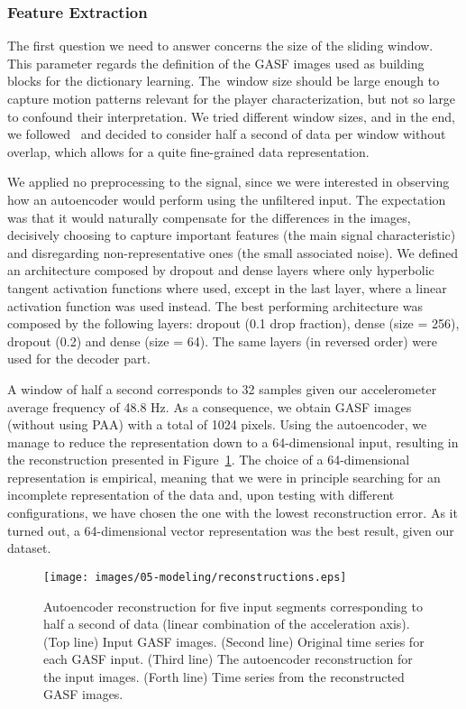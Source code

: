 {\subsubsection{Feature Extraction}

The first question we need to answer concerns the size of the sliding window. This parameter regards the definition of the GASF images used as building blocks for the dictionary learning. The~window size should be large enough to capture motion patterns relevant for the player characterization, but not so large to confound their interpretation. We tried different window sizes, and in the end, we followed~\cite{oliveira_activity_2017} and decided to consider half a second of data per window without overlap, which allows for a quite fine-grained data representation.

We applied no preprocessing to the signal, since we were interested in observing how an autoencoder would perform using the unfiltered input. The expectation was that it would naturally compensate for the differences in the images, decisively choosing to capture important features (the main signal characteristic) and disregarding non-representative ones (the small associated noise). We defined an architecture composed by dropout and dense layers where only hyperbolic tangent activation functions where used, except in the last layer, where a linear activation function was used instead. The best performing architecture was composed by the following layers: dropout (0.1 drop fraction), dense (size = 256), dropout (0.2) and dense (size = 64). The same layers (in reversed order) were used for the decoder part.

A window of half a second corresponds to 32 samples given our accelerometer average frequency of 48.8 Hz. As a consequence, we obtain GASF images (without using PAA) with a total of 1024 pixels. Using the autoencoder, we manage to reduce the representation down to a 64-dimensional input, resulting in the reconstruction presented in Figure~\ref{figure:reconstruction}. The choice of a 64-dimensional representation is empirical, meaning that we were in principle searching for an incomplete representation of the data and, upon testing with different configurations, we have chosen the one with the lowest reconstruction error. As it turned out, a 64-dimensional vector representation was the best result, given our dataset. 

\begin{figure}[H]
	\centering
	\texttt{[image: images/05-modeling/reconstructions.eps]}
	\caption{Autoencoder reconstruction for five input segments corresponding to half a second of data (linear combination of the acceleration axis). ({Top line}) Input GASF images. ({Second line}) Original time series for each GASF input. ({Third line}) The autoencoder reconstruction for the input images. ({Forth line}) Time series from the reconstructed GASF images.}
  \label{figure:reconstruction}
\end{figure}

}
